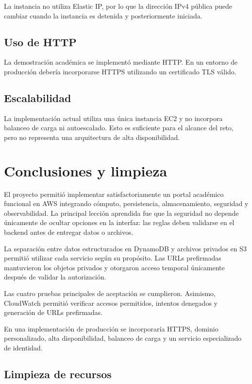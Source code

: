 \documentclass[11pt,letterpaper]{article}
\begin{document}
La instancia no utiliza Elastic IP, por lo que la dirección IPv4 pública puede cambiar cuando la instancia es detenida y posteriormente iniciada.

\subsection{Uso de HTTP}

La demostración académica se implementó mediante HTTP. En un entorno de producción debería incorporarse HTTPS utilizando un certificado TLS válido.

\subsection{Escalabilidad}

La implementación actual utiliza una única instancia EC2 y no incorpora balanceo de carga ni autoescalado. Esto es suficiente para el alcance del reto, pero no representa una arquitectura de alta disponibilidad.

\section{Conclusiones y limpieza}

El proyecto permitió implementar satisfactoriamente un portal académico funcional en AWS integrando cómputo, persistencia, almacenamiento, seguridad y observabilidad. La principal lección aprendida fue que la seguridad no depende únicamente de ocultar opciones en la interfaz: las reglas deben validarse en el backend antes de entregar datos o archivos.

La separación entre datos estructurados en DynamoDB y archivos privados en S3 permitió utilizar cada servicio según su propósito. Las URLs prefirmadas mantuvieron los objetos privados y otorgaron acceso temporal únicamente después de validar la autorización.

Las cuatro pruebas principales de aceptación se cumplieron. Asimismo, CloudWatch permitió verificar accesos permitidos, intentos denegados y generación de URLs prefirmadas.

En una implementación de producción se incorporaría HTTPS, dominio personalizado, alta disponibilidad, balanceo de carga y un servicio especializado de identidad.

\subsection{Limpieza de recursos}
\end{document}
